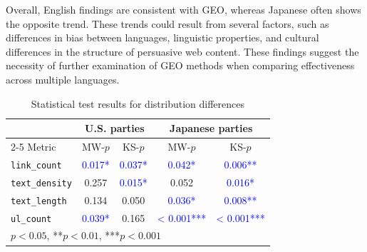 Overall, English findings are consistent with GEO, whereas Japanese often shows the opposite trend.
These trends could result from several factors, such as differences in bias between languages, linguistic properties, and cultural differences in the structure of persuasive web content.
These findings suggest the necessity of further examination of GEO methods when comparing effectiveness across multiple languages.



\begin{table}[t]
  \centering
  \caption{Statistical test results for distribution differences}
  \label{tab:significance_tests}
  \begin{tabular}{l cc cc}
    \hline
    & \multicolumn{2}{c}{U.S. parties} & \multicolumn{2}{c}{Japanese parties} \\
    \cline{2-5}
    Metric & MW-$ p $ & KS-$ p $ & MW-$ p $ & KS-$ p $ \\
    \hline
    \texttt{link\_count}   & \textcolor{blue}{0.017*}     & \textcolor{blue}{0.037*}    & \textcolor{blue}{0.042*}    & \textcolor{blue}{0.006**}   \\
    \texttt{text\_density} & 0.257     & \textcolor{blue}{0.015*}    & 0.052     & \textcolor{blue}{0.016*}    \\
    \texttt{text\_length}  & 0.134     & 0.050     & \textcolor{blue}{0.036*}    & \textcolor{blue}{0.008**}   \\
    \texttt{ul\_count}     & \textcolor{blue}{0.039*}     & 0.165     & \textcolor{blue}{< 0.001***}   & \textcolor{blue}{< 0.001***}  \\
    \hline
    \multicolumn{5}{l}{\footnotesize *$ p < 0.05 $, **$ p < 0.01 $, ***$ p < 0.001 $} \\
  \end{tabular}
\end{table}
